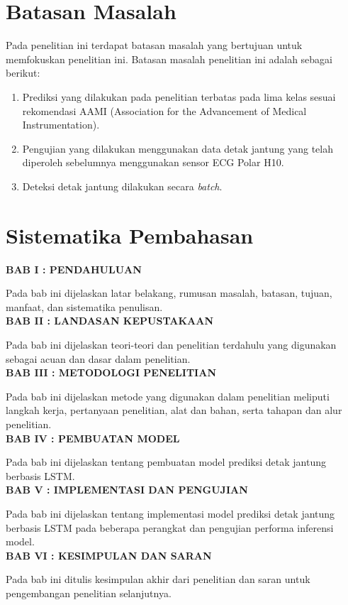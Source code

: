 \section{Batasan Masalah}

Pada penelitian ini terdapat batasan masalah yang bertujuan untuk memfokuskan penelitian ini. Batasan masalah penelitian ini adalah sebagai berikut:
\begin{enumerate}
  \item Prediksi yang dilakukan pada penelitian terbatas pada lima kelas sesuai rekomendasi AAMI (Association for the Advancement of Medical Instrumentation).
  \item Pengujian yang dilakukan menggunakan data detak jantung yang telah diperoleh sebelumnya menggunakan sensor ECG Polar H10.
  \item Deteksi detak jantung dilakukan secara \textit{batch}.
\end{enumerate}




\section{Sistematika Pembahasan}
\noindent
\textbf{BAB I : PENDAHULUAN}

Pada bab ini dijelaskan latar belakang, rumusan masalah, batasan,
tujuan, manfaat,  dan sistematika penulisan.\\

\noindent
\textbf{BAB II : LANDASAN KEPUSTAKAAN}

Pada bab ini dijelaskan teori-teori dan penelitian terdahulu yang
digunakan sebagai acuan dan dasar dalam penelitian.\\

\noindent
\textbf{BAB III : METODOLOGI PENELITIAN}

Pada bab ini dijelaskan metode yang digunakan dalam penelitian
meliputi langkah kerja, pertanyaan penelitian, alat dan bahan, serta
tahapan dan alur penelitian.\\

%

\noindent
\textbf{BAB IV : PEMBUATAN MODEL}

Pada bab ini dijelaskan tentang pembuatan model prediksi detak jantung berbasis LSTM.\\

\noindent
\textbf{BAB V : IMPLEMENTASI DAN PENGUJIAN}

Pada bab ini dijelaskan tentang implementasi model prediksi detak jantung berbasis LSTM pada beberapa perangkat dan pengujian performa inferensi model.\\

\noindent
\textbf{BAB VI : KESIMPULAN DAN SARAN}

Pada bab ini ditulis kesimpulan akhir dari penelitian dan saran untuk
pengembangan penelitian selanjutnya.\\
